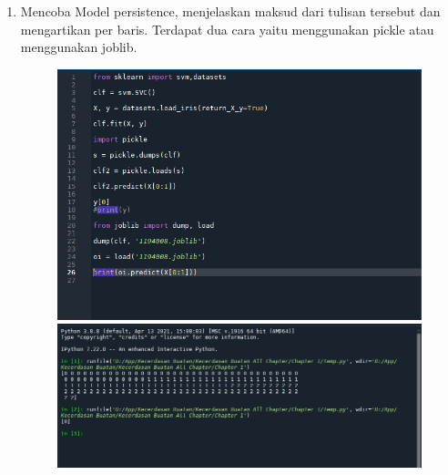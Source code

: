 \begin{enumerate}
\item
Mencoba Model persistence, menjelaskan maksud dari tulisan tersebut dan mengartikan per baris. Terdapat dua cara yaitu menggunakan pickle atau menggunakan joblib.
	\begin{figure}[!htbp]
		\centering
		\includegraphics[scale=0.5]{figures/4.PNG}
		\includegraphics[scale=0.4]{figures/4a.PNG}
	\end{figure}


\end{enumerate}
